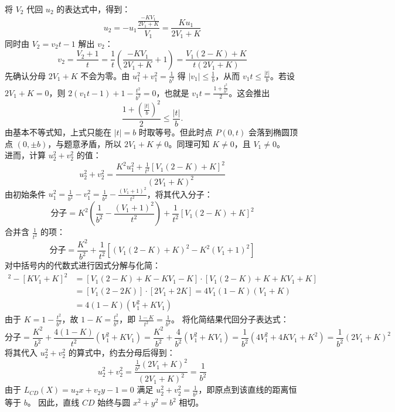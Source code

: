 \begin{solution}
将 $V_2$ 代回 $u_2$ 的表达式中，得到：
$$u_2 = -u_1 \frac{\frac{-K V_1}{2V_1 + K}}{V_1} = \frac{K u_1}{2V_1 + K}$$
同时由 $V_2 = v_2 t - 1$ 解出 $v_2$：
$$v_2 = \frac{V_2 + 1}{t} = \frac{1}{t} \left( \frac{-K V_1}{2V_1 + K} + 1 \right) = \frac{V_1(2 - K) + K}{t(2V_1 + K)}$$
先确认分母 $2V_1 + K$ 不会为零。由 $u_1^2 + v_1^2 = \frac{1}{b^2}$ 得 $|v_1| \le \frac{1}{b}$，从而 $v_1 t \le \frac{|t|}{b}$。若设 $2V_1 + K = 0$，则 $2(v_1 t - 1) + 1 - \frac{t^2}{b^2} = 0$，也就是 $v_1 t = \frac{1 + \frac{t^2}{b^2}}{2}$。这会推出
\[
\frac{1 + (\frac{|t|}{b})^2}{2} \le \frac{|t|}{b}.
\]
由基本不等式知，上式只能在 $|t| = b$ 时取等号。但此时点 $P(0,t)$ 会落到椭圆顶点 $(0,\pm b)$，与题意矛盾，所以 $2V_1 + K \neq 0$。同理可知 $K \neq 0$，且 $V_1 \neq 0$。\\
进而，计算 $u_2^2 + v_2^2$ 的值：
$$u_2^2 + v_2^2 = \frac{K^2 u_1^2 + \frac{1}{t^2} [V_1(2 - K) + K]^2}{(2V_1 + K)^2}$$
由初始条件 $u_1^2 = \frac{1}{b^2} - v_1^2 = \frac{1}{b^2} - \frac{(V_1 + 1)^2}{t^2}$，将其代入分子：
$$\text{分子} = K^2 \left( \frac{1}{b^2} - \frac{(V_1 + 1)^2}{t^2} \right) + \frac{1}{t^2} [V_1(2 - K) + K]^2$$
合并含 $\frac{1}{t^2}$ 的项：
$$\text{分子} = \frac{K^2}{b^2} + \frac{1}{t^2} \left[ (V_1(2 - K) + K)^2 - K^2(V_1 + 1)^2 \right]$$
对中括号内的代数式进行因式分解与化简：
\begin{align*}
[V_1(2 - K) + K]^2 - [K V_1 + K]^2 &= [V_1(2 - K) + K - K V_1 - K] \cdot [V_1(2 - K) + K + K V_1 + K] \\
&= [V_1(2 - 2K)] \cdot [2 V_1 + 2K] = 4 V_1 (1 - K) (V_1 + K) \\
&= 4(1 - K)(V_1^2 + K V_1)
\end{align*}
由于 $K = 1 - \frac{t^2}{b^2}$，故 $1 - K = \frac{t^2}{b^2}$，即 $\frac{1 - K}{t^2} = \frac{1}{b^2}$。
将化简结果代回分子表达式：
$$\text{分子} = \frac{K^2}{b^2} + \frac{4(1 - K)}{t^2} (V_1^2 + K V_1) = \frac{K^2}{b^2} + \frac{4}{b^2} (V_1^2 + K V_1) = \frac{1}{b^2} (4 V_1^2 + 4 K V_1 + K^2) = \frac{1}{b^2} (2V_1 + K)^2$$
将其代入 $u_2^2 + v_2^2$ 的算式中，约去分母后得到：
$$u_2^2 + v_2^2 = \frac{\frac{1}{b^2} (2V_1 + K)^2}{(2V_1 + K)^2} = \frac{1}{b^2}$$
由于 $L_{CD}(X) = u_2 x + v_2 y - 1 = 0$ 满足 $u_2^2 + v_2^2 = \frac{1}{b^2}$，即原点到该直线的距离恒等于 $b$。
因此，直线 $CD$ 始终与圆 $x^2 + y^2 = b^2$ 相切。
\end{solution}




